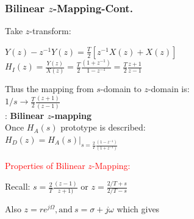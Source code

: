 \documentclass[mathserif, 10pt]{beamer} %
\begin{document}
\frame
{
\small
\frametitle{Bilinear $z$-Mapping-Cont.}

Take $z$-transform:\\ \vspace{.05in}

$Y(z)-z^{-1}Y(z) = \frac{T}{2}[z^{-1}X(z)+X(z)]$\\ \vspace{.05in}
$H_I(z) = \frac{Y(z)}{X(z)} = \frac{T}{2}\frac{(1+z^{-1})}{1-z^{-1}} = \frac{T}{2}\frac{z+1}{z-1}$ \\ \vspace{.05in}

Thus the mapping from $s$-domain to $z$-domain is:\\ \vspace{.05in}
$1/s \to \frac{T}{2}\frac{(z+1)}{(z-1)}$\\ \vspace{.1in}
:  \textbf{Bilinear $z$-mapping} \\ \vspace{.1in}
Once $H_A(s)$ prototype is described: \\ \vspace{.1in}
$H_D(z) = H_A(s)|_{s=\frac{2}{T}\frac{(1-z^{-1})}{(1+z^{-1})}}$\\ \vspace{.1in}

\textcolor{red}{Properties of Bilinear $z$-Mapping:}\\ \vspace{.1in}

Recall: $s = \frac{2}{T}\frac{(z-1)}{z+1)}$ or $z = \frac{2/T+s}{2/T-s}$\\ \vspace{.05in}

Also $z=re^{j\Omega}, \text{and} ~s = \sigma+j\omega$ which gives \\
}
\end{document}

